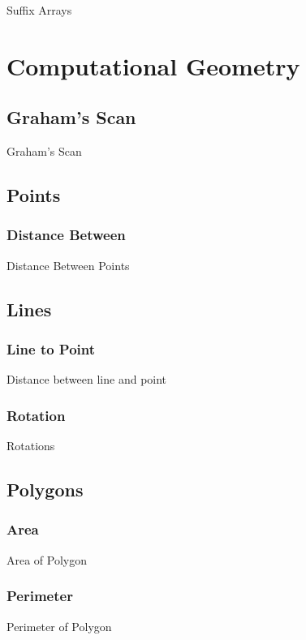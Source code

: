 \documentclass[10pt,oneside]{memoir}
\begin{document}
    Suffix Arrays


\chapter{Computational Geometry}

    \section{Graham's Scan}

    Graham's Scan

    \section{Points}

    \subsection{Distance Between}

    Distance Between Points

    \section{Lines}

    \subsection{Line to Point}

    Distance between line and point

    \subsection{Rotation}

    Rotations

    \section{Polygons}

    \subsection{Area}

    Area of Polygon

    \subsection{Perimeter}

    Perimeter of Polygon
\end{document}
